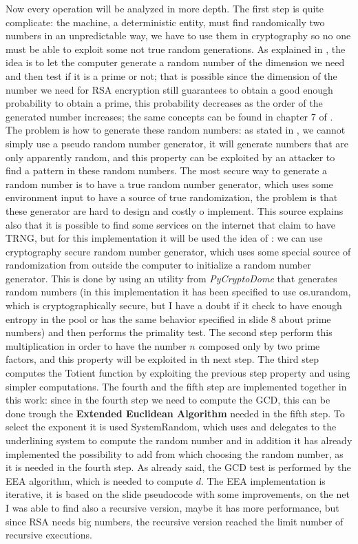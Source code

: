 \documentclass{article}
\begin{document}
Now every operation will be analyzed in more depth.\newline
The first step is quite complicate: the machine, a deterministic entity, must find randomically two numbers in an unpredictable way, we have to use them in cryptography so no one must be able to exploit some not true random generations. As explained in \cite{primeNum}, the idea is to let the computer generate a random number of the dimension we need and then test if it is a prime or not; that is possible since the dimension of the number we need for RSA encryption still guarantees to obtain a good enough probability to obtain a prime, this probability decreases as the order of the generated number increases; the same concepts can be found in chapter 7 of \cite{10.5555/1721909}. The problem is how to generate these random numbers: as stated in \cite{TRNG}, we cannot simply use a pseudo random number generator, it will generate numbers that are only apparently random, and this property can be exploited by an attacker to find a pattern in these random numbers. The most secure way to generate a random number is to have a true random number generator, which uses some environment input to have a source of true randomization, the problem is that these generator are hard to design and costly o implement. This source \cite{TRNG} explains also that it is possible to find some services on the internet that claim to have TRNG, but for this implementation it will be used the idea of \cite{pyrandom}: we can use cryptography secure random number generator, which uses some special source of randomization from outside the computer to initialize a random number generator. This is done by using an utility from \textit{PyCryptoDome} that generates random numbers (in this implementation it has been specified to use os.urandom, which is cryptographically secure, but I have a doubt if it check to have enough entropy in the pool or has the same behavior specified in slide 8 about prime numbers) and then performs the primality test. \newline
The second step perform this multiplication in order to have the number $n$ composed only by two prime factors, and this property will be exploited in th next step. \newline
The third step computes the Totient function by exploiting the previous step property and using simpler computations. \newline
The fourth and the fifth step are implemented together in this work: since in the fourth step we need to compute the GCD, this can be done trough the \textbf{Extended Euclidean Algorithm} needed in the fifth step. To select the exponent it is used SystemRandom, which uses and delegates to the underlining system to compute the random number and in addition it has already implemented the possibility to add from which choosing the random number, as it is needed in the fourth step. As already said, the GCD test is performed by the EEA algorithm, which is needed to compute $d$. The EEA implementation is iterative, it is based on the slide pseudocode with some improvements, on the net I was able to find also a recursive version, maybe it has more performance, but since RSA needs big numbers, the recursive version reached the limit number of recursive executions.
\end{document}
